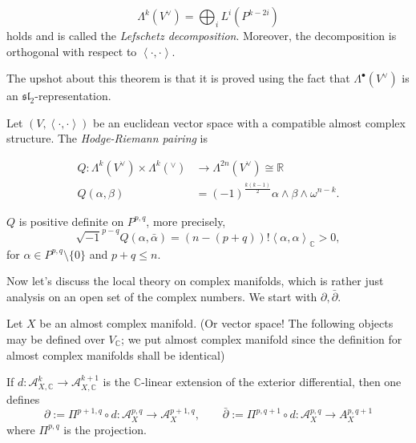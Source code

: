 \begin{theorem}
\label{theorem-lefschetz-decomposition}
$$
\Lambda^k(V^\vee)
=
\bigoplus_i L^i(P^{k-2i})
$$
holds and is called the {\it Lefschetz decomposition}.
Moreover, the decomposition is orthogonal with respect to
$\left<\cdot,\cdot\right>$.
\end{theorem}

\noindent
The upshot about this theorem
is that it is proved using the fact
that $\Lambda^\bullet(V^\vee)$ is an $\mathfrak{sl}_2$-representation.

\begin{definition}
\label{definition-hodge-riemann-pairing}
\begin{reference}
\cite[Definition 1.2.35]{huc}
\end{reference}
Let $(V,\left<\cdot,\cdot\right>)$
be an euclidean vector space with a compatible almost complex structure.
The {\it Hodge-Riemann pairing} is

\begin{align*}
Q: \Lambda^k(V^\vee)\times \Lambda^k(^\vee) &\longrightarrow 
\Lambda^{2n}(V^\vee)\cong \mathbb{R} \\
Q(\alpha,\beta)&
=(-1)^{\frac{k(k-1)}{2}}\alpha\wedge\beta\wedge\omega^{n-k}.
\end{align*}
\end{definition}

\begin{theorem}
\label{theorem-hodge-riemann-relation}
$Q$ is positive definite on $P^{p,q}$, more precisely,
$$
\sqrt{-1}^{p-q}Q(\alpha,\bar{\alpha})
=(n-(p+q))!\left<\alpha,\alpha\right>_{\mathbb{C}}>0,
$$
for $\alpha \in P^{p,q}\setminus\{0\}$ and $p+q\leq n$.
\end{theorem}


\medskip\noindent
Now let's discuss the local theory on complex manifolds,
which is rather just analysis on an open set of the complex numbers.
We start with $\partial,\bar\partial$.

\begin{definition}
\label{definition-dbar}
\begin{reference}
\cite[Definition 1.3.5]{huc}
\end{reference}
Let $X$ be an almost complex manifold.
(Or vector space! The following 
objects may be defined over $V_{\mathbb{C}}$;
we put almost complex manifold since the definition 
for almost complex manifolds shall be identical)

If  $d:\mathcal{A}^k_{X,\mathbb{C}}\to \mathcal{A}^{k+1}_{X,\mathbb{C}}$ 
is the $\mathbb{C}$-linear extension of the
exterior differential, then one defines
$$
\partial:=\Pi^{p+1,q} \circ d
:\mathcal{A}^{p,q}_X \to \mathcal{A}^{p+1,q}_X,
\qquad 
\bar{\partial}:=\Pi^{p,q+1} \circ d
:\mathcal{A}^{p,q}_X \to A^{p,q+1}_X
$$
where $\Pi^{p,q}$ is the projection.
\end{definition}

